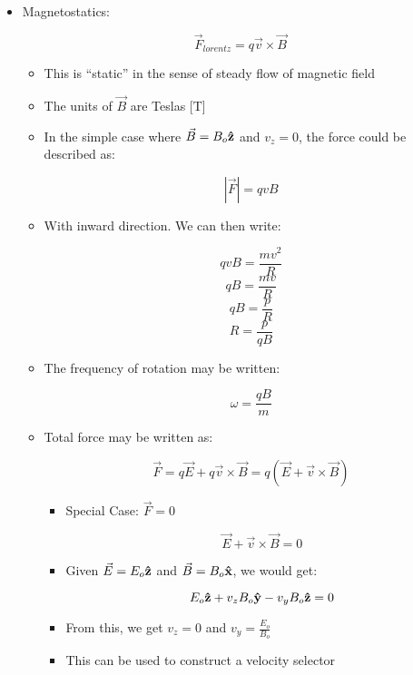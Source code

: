 \begin{itemize}

  \item Magnetostatics:

    $$\vec{F}_{lorentz}=q\vec{v}\times\vec{B}$$

    \begin{itemize}

      \item This is ``static'' in the sense of steady flow of magnetic field

      \item The units of $\vec{B}$ are Teslas [$\si{\tesla}$]

      \item In the simple case where $\vec{B}=B_o\bold{\hat{z}}$ and $v_z=0$, the force could be described as:

        $$|\vec{F}|=qvB$$

      \item With inward direction. We can then write:

        $$qvB=\frac{mv^2}{R}$$
        $$qB=\frac{mv}{R}$$
        $$qB=\frac{p}{R}$$
        $$R=\frac{p}{qB}$$

      \item The frequency of rotation may be written:

        $$\omega=\frac{qB}{m}$$

      \item Total force may be written as:

        $$\vec{F}=q\vec{E}+q\vec{v}\times\vec{B}=q(\vec{E}+\vec{v}\times\vec{B})$$

        \begin{itemize}

          \item Special Case: $\vec{F}=0$

            $$\vec{E}+\vec{v}\times\vec{B}=0$$

          \item Given $\vec{E}=E_o\bold{\hat{z}}$ and $\vec{B}=B_o\bold{\hat{x}}$, we would get:

            $$E_o\bold{\hat{z}}+v_zB_o\bold{\hat{y}}-v_yB_o\bold{\hat{z}}=0$$

          \item From this, we get $v_z=0$ and $v_y=\frac{E_o}{B_o}$

          \item This can be used to construct a velocity selector


\end{itemize}
\end{itemize}
\end{itemize}
